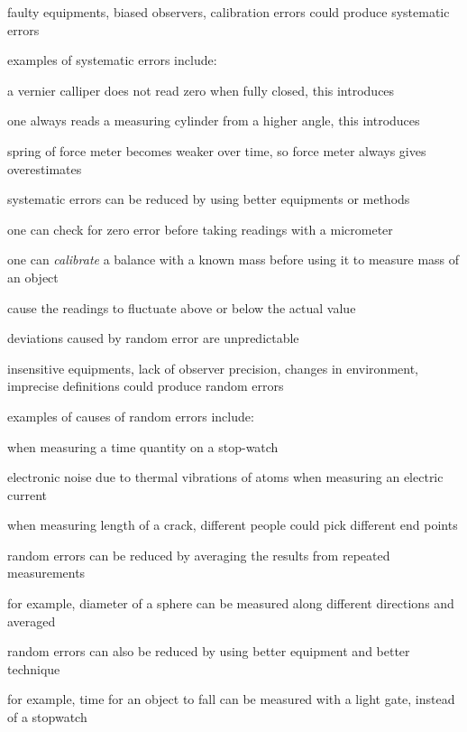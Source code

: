 \cmt faulty equipments, biased observers, calibration errors could produce systematic errors

examples of systematic errors include:

\titem a vernier calliper does not read zero when fully closed, this introduces 

\titem one always reads a measuring cylinder from a higher angle, this introduces 

\titem spring of force meter becomes weaker over time, so force meter always gives overestimates

\cmt systematic errors can be reduced by using better equipments or methods

\titem one can check for zero error before taking readings with a micrometer

\titem one can \emph{calibrate} a balance with a known mass before using it to measure mass of an object



\begin{ilight}
	 cause the readings to fluctuate above or below the actual value
\end{ilight}


\cmt deviations caused by random error are unpredictable

\cmt insensitive equipments, lack of observer precision, changes in environment, imprecise definitions could produce random errors

examples of causes of random errors include:

\titem {} when measuring a time quantity on a stop-watch

\titem electronic noise due to thermal vibrations of atoms when measuring an electric current

\titem when measuring length of a crack, different people could pick different end points

\cmt random errors can be reduced by averaging the results from repeated measurements

for example, diameter of a sphere can be measured along different directions and averaged

\cmt random errors can also be reduced by using better equipment and better technique

for example, time for an object to fall can be measured with a light gate, instead of a stopwatch

